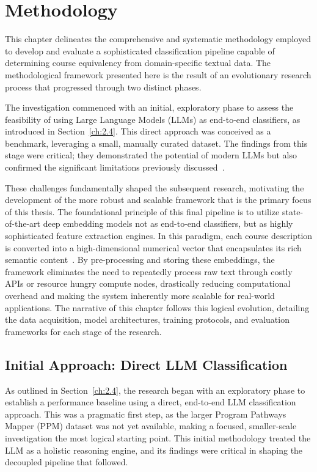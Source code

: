 \chapter{Methodology}\label{ch:3}
This chapter delineates the comprehensive and systematic methodology employed to develop and evaluate a sophisticated classification pipeline capable of determining course equivalency from domain-specific textual data. The methodological framework presented here is the result of an evolutionary research process that progressed through two distinct phases.

The investigation commenced with an initial, exploratory phase to assess the feasibility of using Large Language Models (LLMs) as end-to-end classifiers, as introduced in Section~\ref{ch:2.4}. This direct approach was conceived as a benchmark, leveraging a small, manually curated dataset. The findings from this stage were critical; they demonstrated the potential of modern LLMs but also confirmed the significant limitations previously discussed~\cite{pardos-articulation-2019}.

These challenges fundamentally shaped the subsequent research, motivating the development of the more robust and scalable framework that is the primary focus of this thesis. The foundational principle of this final pipeline is to utilize state-of-the-art deep embedding models not as end-to-end classifiers, but as highly sophisticated feature extraction engines. In this paradigm, each course description is converted into a high-dimensional numerical vector that encapsulates its rich semantic content~\cite{devlin2019bertpretrainingdeepbidirectional}. By pre-processing and storing these embeddings, the framework eliminates the need to repeatedly process raw text through costly APIs or resource hungry compute nodes, drastically reducing computational overhead and making the system inherently more scalable for real-world applications. The narrative of this chapter follows this logical evolution, detailing the data acquisition, model architectures, training protocols, and evaluation frameworks for each stage of the research.

\section{Initial Approach: Direct LLM Classification}\label{ch:3.1}
As outlined in Section~\ref{ch:2.4}, the research began with an exploratory phase to establish a performance baseline using a direct, end-to-end LLM classification approach. This was a pragmatic first step, as the larger Program Pathways Mapper (PPM) dataset was not yet available, making a focused, smaller-scale investigation the most logical starting point. This initial methodology treated the LLM as a holistic reasoning engine, and its findings were critical in shaping the decoupled pipeline that followed.

